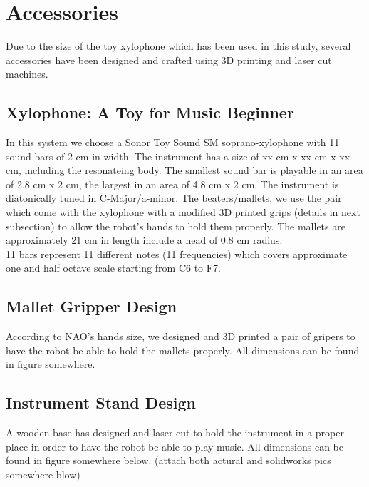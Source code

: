 \section{Accessories}
Due to the size of the toy xylophone which has been used in this study, several 
accessories have been designed and crafted using 3D printing and laser cut 
machines.\\

\subsection{Xylophone: A Toy for Music Beginner}
In this system we choose a Sonor Toy Sound SM soprano-xylophone with 11 sound 
bars of 2 cm in width. The instrument has a size of xx cm x xx cm x xx cm, 
including the resonateing body. The smallest sound bar is playable in an area of 
2.8 cm x 2 cm, the largest in an area of 4.8 cm x 2 cm. The instrument is 
diatonically tuned in C-Major/a-minor. The beaters/mallets, we use the pair which 
come with the xylophone with a modified 3D printed grips (details in next 
subsection) to allow the robot's hands to hold them properly. The mallets 
are approximately 21 cm in length include a head of 0.8 cm radius.\\ 
11 bars represent 11 different notes (11 frequencies) which covers 
approximate one and half octave scale starting from C6 to F7. \\

\subsection{Mallet Gripper Design}
According to NAO's hands size, we designed and 3D printed a pair of gripers to 
have the robot be able to hold the mallets properly. All dimensions can be found 
in figure somewhere.\\

\subsection{Instrument Stand Design}
A wooden base has designed and laser cut to hold the instrument in a proper place 
in order to have the robot be able to play music. All dimensions can be found in 
figure somewhere below. (attach both actural and solidworks pics somewhere blow)\\

